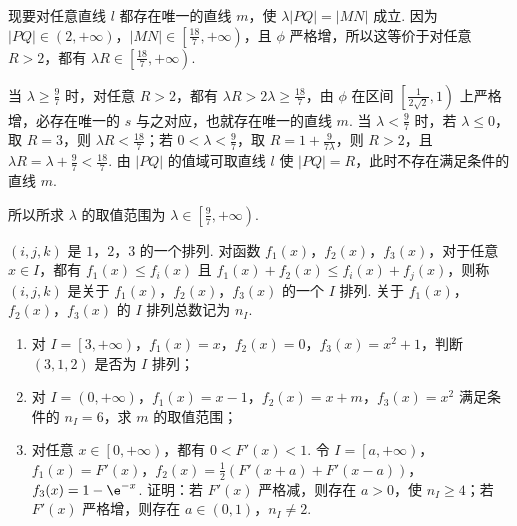 \documentclass[UTF8,a4paper,oneside,11pt]{ctexbook}
\begin{document}
\begin{solution}
\begin{enumerate}
现要对任意直线 \( l \) 都存在唯一的直线 \( m \)，使 \( \lambda \left| PQ \right|=\left| MN \right| \) 成立. 因为 \( \left| PQ \right| \in \left( 2,+\infty \right) \)，\( \left| MN \right| \in \left[ \frac{18}{7},+\infty \right) \)，且 \( \phi \) 严格增，所以这等价于对任意 \( R>2 \)，都有 \( \lambda R\in \left[ \frac{18}{7},+\infty \right) \).

当 \( \lambda\ge \frac{9}{7} \) 时，对任意 \( R>2 \)，都有 \( \lambda R>2\lambda\ge \frac{18}{7} \)，由 \( \phi \) 在区间 \( \left[ \frac{1}{2\sqrt{2}},1 \right) \) 上严格增，必存在唯一的 \( s \) 与之对应，也就存在唯一的直线 \( m \). 当 \( \lambda<\frac{9}{7} \) 时，若 \( \lambda\le 0 \)，取 \( R=3 \)，则 \( \lambda R<\frac{18}{7} \)；若 \( 0<\lambda<\frac{9}{7} \)，取 \( R=1+\frac{9}{7\lambda} \)，则 \( R>2 \)，且 \( \lambda R=\lambda+\frac{9}{7}<\frac{18}{7} \). 由 \( \left| PQ \right| \) 的值域可取直线 \( l \) 使 \( \left| PQ \right|=R \)，此时不存在满足条件的直线 \( m \).

所以所求 \( \lambda \) 的取值范围为 \( \lambda\in \left[ \frac{9}{7},+\infty \right) \).
\end{enumerate}
\end{solution}

\begin{problem}
\( \left( i,j,k \right) \) 是 \(1\)，\(2\)，\(3\) 的一个排列. 对函数 \( f_1(x) \)，\( f_2(x) \)，\( f_3(x) \)，对于任意 \( x\in I \)，都有 \( f_1(x)\le f_i(x) \) 且 \( f_1(x)+f_2(x)\le f_i(x)+f_j(x) \)，则称 \( \left( i,j,k \right) \) 是关于 \( f_1(x) \)，\( f_2(x) \)，\( f_3(x) \) 的一个 \(I\) 排列. 关于 \( f_1(x) \)，\( f_2(x) \)，\( f_3(x) \) 的 \(I\) 排列总数记为 \( n_I \).

\begin{enumerate}
\item 对 \( I=\left[ 3,+\infty \right) \)，\( f_1(x)=x \)，\( f_2(x)=0 \)，\( f_3(x)=x^2+1 \)，判断 \( \left( 3,1,2 \right) \) 是否为 \(I\) 排列；
\item 对 \( I=\left( 0,+\infty \right) \)，\( f_1(x)=x-1 \)，\( f_2(x)=x+m \)，\( f_3(x)=x^2 \) 满足条件的 \( n_I=6 \)，求 \( m \) 的取值范围；
\item 对任意 \( x\in \left[ 0,+\infty \right) \)，都有 \( 0<F'(x)<1 \). 令 \( I=\left[ a,+\infty \right) \)，\( f_1(x)=F'(x) \)，\( f_2(x)=\frac{1}{2}\left( F'\left( x+a \right)+F'\left( x-a \right) \right) \)，\( f_3(x)=1-\e^{-x} \). 证明：若 \( F'(x) \) 严格减，则存在 \( a>0 \)，使 \( n_I\ge 4 \)；若 \( F'(x) \) 严格增，则存在 \( a\in \left( 0,1 \right) \)，\( n_I\neq 2 \).
\end{enumerate}
\end{problem}
\end{document}
